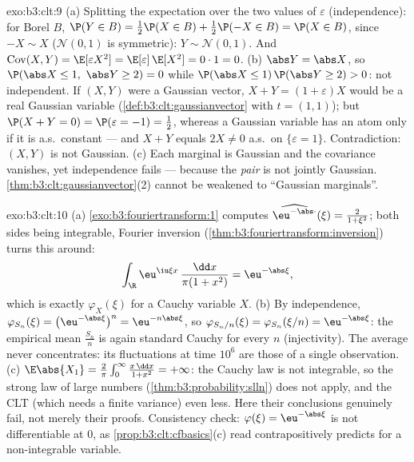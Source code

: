 \begin{solution}{exo:b3:clt:9}
(a) Splitting the expectation over the two values of
$\varepsilon$ (independence): for Borel $B$, $\P(Y \in B) =
\frac12\P(X \in B) + \frac12\P(-X \in B) = \P(X \in B)$,
since $-X \sim X$ ($\mathcal N(0,1)$ is symmetric): $Y \sim
\mathcal N(0,1)$. And $\operatorname{Cov}(X, Y) =
\E[\varepsilon X^2] = \E[\varepsilon]\,\E[X^2] = 0 \cdot 1 =
0$.
(b) $\abs Y = \abs X$, so $\P(\abs X \leq 1,\ \abs Y \geq 2)
= 0$ while $\P(\abs X \leq 1)\,\P(\abs Y \geq 2) > 0$: not
independent. If $(X, Y)$ were a Gaussian vector, $X + Y =
(1 + \varepsilon)X$ would be a real Gaussian variable
(\cref{def:b3:clt:gaussianvector} with $t = (1,1)$); but
$\P(X + Y = 0) = \P(\varepsilon = -1) = \frac12$, whereas a
Gaussian variable has an atom only if it is a.s.\ constant
--- and $X + Y$ equals $2X \neq 0$ a.s.\ on
$\{\varepsilon = 1\}$. Contradiction: $(X, Y)$ is not
Gaussian.
(c) Each marginal is Gaussian and the covariance vanishes,
yet independence fails --- because the \emph{pair} is not
jointly Gaussian. \cref{thm:b3:clt:gaussianvector}(2) cannot
be weakened to ``Gaussian marginals''.
\end{solution}

\begin{solution}{exo:b3:clt:10}
(a) \cref{exo:b3:fouriertransform:1} computes
$\widehat{\eu^{-\abs\cdot}}(\xi) = \frac{2}{1 + \xi^2}$;
both sides being integrable, Fourier inversion
(\cref{thm:b3:fouriertransform:inversion}) turns this
around:
\[
\int_\R\eu^{\iu\xi x}\,\frac{\dd x}{\pi(1 + x^2)} =
\eu^{-\abs\xi},
\]
which is exactly $\varphi_X(\xi)$ for a Cauchy variable $X$.
(b) By independence, $\varphi_{S_n}(\xi) =
\bigl(\eu^{-\abs\xi}\bigr)^n = \eu^{-n\abs\xi}$, so
$\varphi_{S_n/n}(\xi) = \varphi_{S_n}(\xi/n) =
\eu^{-\abs\xi}$: the empirical mean $\frac{S_n}n$ is again
standard Cauchy for every $n$ (injectivity). The average
never concentrates: its fluctuations at time $10^6$ are
those of a single observation.
(c) $\E\abs{X_1} = \frac2\pi\int_0^\infty\frac{x\,\dd x}{1 +
x^2} = +\infty$: the Cauchy law is not integrable, so the
strong law of large numbers
(\cref{thm:b3:probability:slln}) does not apply, and the CLT
(which needs a finite variance) even less. Here their
conclusions genuinely fail, not merely their proofs.
Consistency check: $\varphi(\xi) = \eu^{-\abs\xi}$ is not
differentiable at $0$, as \cref{prop:b3:clt:cfbasics}(c)
read contrapositively predicts for a non-integrable
variable.
\end{solution}

